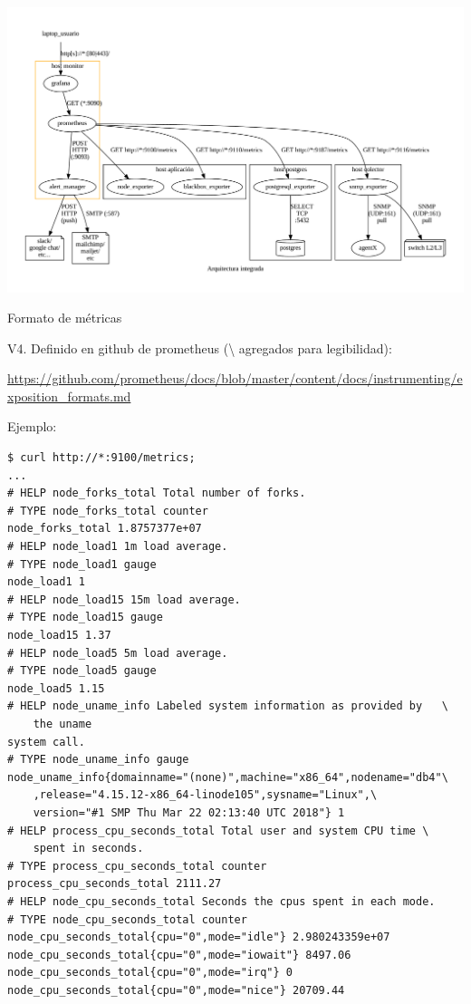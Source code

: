 \documentclass[11pt,spanish]{article}
\newcommand{\rowsp}[1][1em]{\vspace{#1}}
\newcommand{\hone}[1]{{\rowsp[0.3em]\noindent\Large #1 \rowsp[0.3em]}}
\begin{document}
\newpage %
\begin{center}
	\includegraphics[keepaspectratio=true,width=\textwidth,height=\textheight]{img/prometheus_loki/arq}
\end{center}

\newpage %
\hone{Formato de métricas}

V4. Definido en github de prometheus (\textbackslash{} agregados para legibilidad):

\href{https://github.com/prometheus/docs/blob/master/content/docs/instrumenting/exposition_formats.md}{\tiny https://github.com/prometheus/docs/blob/master/content/docs/instrumenting/exposition\_formats.md}

Ejemplo:
\begin{lstlisting}
$ curl http://*:9100/metrics;
...
# HELP node_forks_total Total number of forks.
# TYPE node_forks_total counter
node_forks_total 1.8757377e+07
# HELP node_load1 1m load average.
# TYPE node_load1 gauge
node_load1 1
# HELP node_load15 15m load average.
# TYPE node_load15 gauge
node_load15 1.37
# HELP node_load5 5m load average.
# TYPE node_load5 gauge
node_load5 1.15
# HELP node_uname_info Labeled system information as provided by   \
	the uname
system call.
# TYPE node_uname_info gauge
node_uname_info{domainname="(none)",machine="x86_64",nodename="db4"\
    ,release="4.15.12-x86_64-linode105",sysname="Linux",\
    version="#1 SMP Thu Mar 22 02:13:40 UTC 2018"} 1
# HELP process_cpu_seconds_total Total user and system CPU time \
    spent in seconds.
# TYPE process_cpu_seconds_total counter
process_cpu_seconds_total 2111.27
# HELP node_cpu_seconds_total Seconds the cpus spent in each mode.
# TYPE node_cpu_seconds_total counter
node_cpu_seconds_total{cpu="0",mode="idle"} 2.980243359e+07
node_cpu_seconds_total{cpu="0",mode="iowait"} 8497.06
node_cpu_seconds_total{cpu="0",mode="irq"} 0
node_cpu_seconds_total{cpu="0",mode="nice"} 20709.44
\end{lstlisting}
\end{document}
